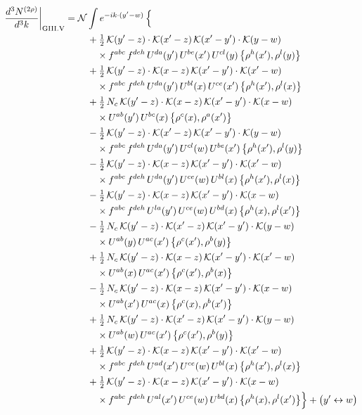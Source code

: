 \documentclass[10pt]{article}
\numberwithin{equation}{section}
\newcommand{\KK}{\mathcal K}
\newcommand{\NN}{\mathcal N}
\begin{document}
\begin{align}
\frac{d^3N^{(2\rho)}}{d^3k}\bigg|_{\rm GIII.V}={}&\NN\int e^{-ik\cdot(y'-w)}\,\Big\{\notag\\
&\quad +\tfrac12\,\KK(y'-z)\cdot\KK(x'-z)\,\KK(x'-y')\cdot\KK(y-w)\notag\\
&\qquad\times f^{abc}\,f^{deh}\,U^{da}(y')\,U^{be}(x')\,U^{cl}(y)\,\big\{\rho^{h}(x'),\rho^{l}(y)\big\}\notag\\
&\quad +\tfrac12\,\KK(y'-z)\cdot\KK(x-z)\,\KK(x'-y')\cdot\KK(x'-w)\notag\\
&\qquad\times f^{abc}\,f^{deh}\,U^{da}(y')\,U^{bl}(x)\,U^{ce}(x')\,\big\{\rho^{h}(x'),\rho^{l}(x)\big\}\notag\\
&\quad +\tfrac12\,N_{c}\,\KK(y'-z)\cdot\KK(x-z)\,\KK(x'-y')\cdot\KK(x-w)\notag\\
&\qquad\times U^{ab}(y')\,U^{bc}(x)\,\big\{\rho^{c}(x),\rho^{a}(x')\big\}\notag\\
&\quad -\tfrac12\,\KK(y'-z)\cdot\KK(x'-z)\,\KK(x'-y')\cdot\KK(y-w)\notag\\
&\qquad\times f^{abc}\,f^{deh}\,U^{da}(y')\,U^{cl}(w)\,U^{be}(x')\,\big\{\rho^{h}(x'),\rho^{l}(y)\big\}\notag\\
&\quad -\tfrac12\,\KK(y'-z)\cdot\KK(x-z)\,\KK(x'-y')\cdot\KK(x'-w)\notag\\
&\qquad\times f^{abc}\,f^{deh}\,U^{da}(y')\,U^{ce}(w)\,U^{bl}(x)\,\big\{\rho^{h}(x'),\rho^{l}(x)\big\}\notag\\
&\quad -\tfrac12\,\KK(y'-z)\cdot\KK(x-z)\,\KK(x'-y')\cdot\KK(x-w)\notag\\
&\qquad\times f^{abc}\,f^{deh}\,U^{la}(y')\,U^{ce}(w)\,U^{bd}(x)\,\big\{\rho^{h}(x),\rho^{l}(x')\big\}\notag\\
&\quad -\tfrac12\,N_{c}\,\KK(y'-z)\cdot\KK(x'-z)\,\KK(x'-y')\cdot\KK(y-w)\notag\\
&\qquad\times U^{ab}(y)\,U^{ac}(x')\,\big\{\rho^{c}(x'),\rho^{b}(y)\big\}\notag\\
&\quad +\tfrac12\,N_{c}\,\KK(y'-z)\cdot\KK(x-z)\,\KK(x'-y')\cdot\KK(x'-w)\notag\\
&\qquad\times U^{ab}(x)\,U^{ac}(x')\,\big\{\rho^{c}(x'),\rho^{b}(x)\big\}\notag\\
&\quad -\tfrac12\,N_{c}\,\KK(y'-z)\cdot\KK(x-z)\,\KK(x'-y')\cdot\KK(x-w)\notag\\
&\qquad\times U^{ab}(x')\,U^{ac}(x)\,\big\{\rho^{c}(x),\rho^{b}(x')\big\}\notag\\
&\quad +\tfrac12\,N_{c}\,\KK(y'-z)\cdot\KK(x'-z)\,\KK(x'-y')\cdot\KK(y-w)\notag\\
&\qquad\times U^{ab}(w)\,U^{ac}(x')\,\big\{\rho^{c}(x'),\rho^{b}(y)\big\}\notag\\
&\quad +\tfrac12\,\KK(y'-z)\cdot\KK(x-z)\,\KK(x'-y')\cdot\KK(x'-w)\notag\\
&\qquad\times f^{abc}\,f^{deh}\,U^{ad}(x')\,U^{ce}(w)\,U^{bl}(x)\,\big\{\rho^{h}(x'),\rho^{l}(x)\big\}\notag\\
&\quad +\tfrac12\,\KK(y'-z)\cdot\KK(x-z)\,\KK(x'-y')\cdot\KK(x-w)\notag\\
&\qquad\times f^{abc}\,f^{deh}\,U^{al}(x')\,U^{ce}(w)\,U^{bd}(x)\,\big\{\rho^{h}(x),\rho^{l}(x')\big\}\Big\}+\big(y'\leftrightarrow w\big)\label{R:eq:sum-GIII.V}
\end{align}
\end{document}
